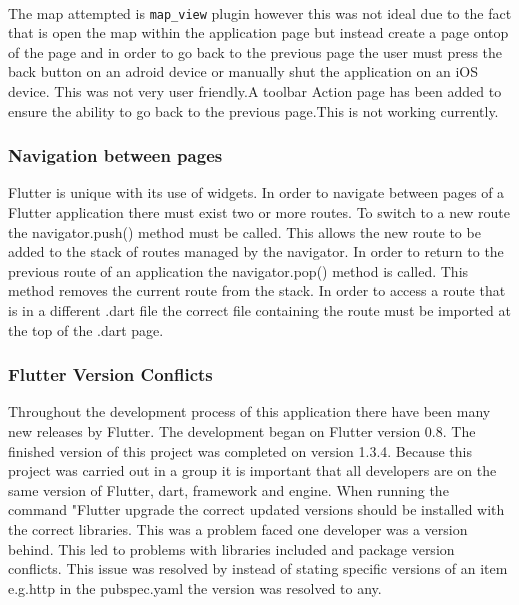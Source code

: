 \paragraph{}
The map attempted is \texttt{map\_view} plugin however this was not ideal due to the fact that is open the map within the application page but instead create a page ontop of the page and in order to go back to the previous page the user must press the back button on an adroid device or manually shut the application on an iOS device. This was not very user friendly.A toolbar Action page has been added to ensure the ability to go back to the previous page.This is not working currently.

\subsubsection{Navigation between pages}
Flutter is unique with its use of widgets. In order to navigate between pages of a Flutter application there must exist two or more routes. To switch to a new route the navigator.push() method must be called. This allows the new route to be added to the stack of routes managed by the navigator. In order to return to the previous route of an application the navigator.pop() method is called. This method removes the current route from the stack. In order to access a route that is in a different .dart file the correct file containing the route must be imported at the top of the .dart page.

\subsubsection{Flutter Version Conflicts}
Throughout the development process of this application there have been many new releases by Flutter. The development began on Flutter version 0.8. The finished version of this project was completed on version 1.3.4. Because this project was carried out in a group it is important that all developers are on the same version of Flutter, dart, framework and engine. When running the command "Flutter upgrade the correct updated versions should be installed with the correct libraries. This was a problem faced one developer was a version behind. This led to problems with libraries included and package version conflicts. This issue was resolved by instead of stating specific versions of an item e.g.http in the pubspec.yaml the version was resolved to any.

